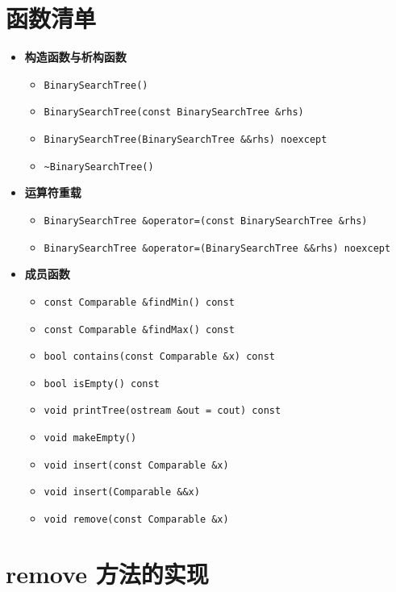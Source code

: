 \documentclass[UTF8]{ctexart}
\begin{document}
\pagestyle{fancy}
\fancyhead{}

\section{函数清单}

\begin{itemize}
    \item \textbf{构造函数与析构函数}
    \begin{itemize}
        \item \verb|BinarySearchTree()|
        \item \verb|BinarySearchTree(const BinarySearchTree &rhs)|
        \item \verb|BinarySearchTree(BinarySearchTree &&rhs) noexcept|
        \item \verb|~BinarySearchTree()|
    \end{itemize}
    \item \textbf{运算符重载}
    \begin{itemize}
        \item \verb|BinarySearchTree &operator=(const BinarySearchTree &rhs)|
        \item \verb|BinarySearchTree &operator=(BinarySearchTree &&rhs) noexcept|
    \end{itemize}
    \item \textbf{成员函数}
    \begin{itemize}
        \item \verb|const Comparable &findMin() const|
        \item \verb|const Comparable &findMax() const|
        \item \verb|bool contains(const Comparable &x) const|
        \item \verb|bool isEmpty() const|
        \item \verb|void printTree(ostream &out = cout) const|
        \item \verb|void makeEmpty()|
        \item \verb|void insert(const Comparable &x)|
        \item \verb|void insert(Comparable &&x)|
        \item \verb|void remove(const Comparable &x)|
    \end{itemize}
\end{itemize}

\section{remove 方法的实现}
\end{document}
